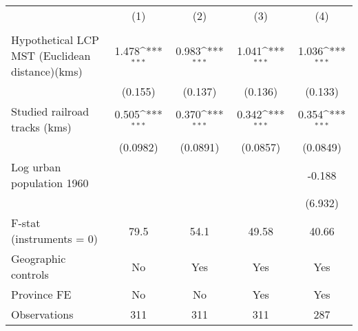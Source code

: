 {
\def\sym#1{\ifmmode^{#1}\else\(^{#1}\)\fi}
\begin{tabular}{l*{4}{c}}
\hline\hline
                &\multicolumn{1}{c}{(1)}&\multicolumn{1}{c}{(2)}&\multicolumn{1}{c}{(3)}&\multicolumn{1}{c}{(4)}\\
                &\multicolumn{1}{c}{}&\multicolumn{1}{c}{}&\multicolumn{1}{c}{}&\multicolumn{1}{c}{}\\
\hline
Hypothetical LCP MST (Euclidean distance)(kms)&    1.478\sym{***}&    0.983\sym{***}&    1.041\sym{***}&    1.036\sym{***}\\
                &  (0.155)         &  (0.137)         &  (0.136)         &  (0.133)         \\
[1em]
Studied railroad tracks (kms)&    0.505\sym{***}&    0.370\sym{***}&    0.342\sym{***}&    0.354\sym{***}\\
                & (0.0982)         & (0.0891)         & (0.0857)         & (0.0849)         \\
[1em]
Log urban population 1960&                  &                  &                  &   -0.188         \\
                &                  &                  &                  &  (6.932)         \\
\hline
F-stat (instruments = 0)&     79.5         &     54.1         &    49.58         &    40.66         \\
Geographic controls&       No         &      Yes         &      Yes         &      Yes         \\
Province FE     &       No         &       No         &      Yes         &      Yes         \\
Observations    &      311         &      311         &      311         &      287         \\
\hline\hline
\end{tabular}
}
